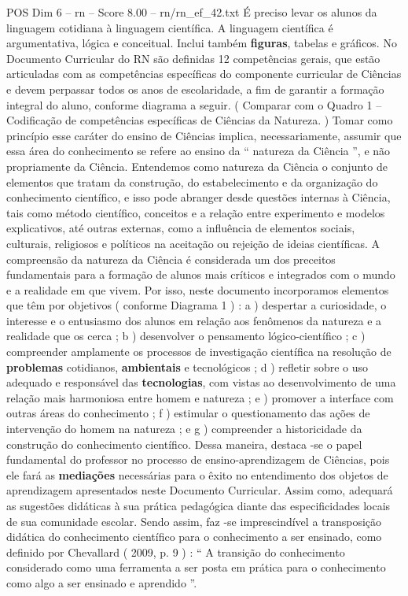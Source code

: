 \begin{textsample}{POS Dim 6 – rn – Score 8.00 – rn/rn\_ef\_42.txt}
É preciso levar os alunos da linguagem cotidiana à linguagem científica.
A linguagem científica é argumentativa, lógica e conceitual.
Inclui também \textbf{figuras}, tabelas e gráficos.
No Documento Curricular do RN são definidas 12 competências gerais, que estão articuladas com as competências específicas do componente curricular de Ciências e devem perpassar todos os anos de escolaridade, a fim de garantir a formação integral do aluno, conforme diagrama a seguir. ( Comparar com o Quadro 1 – Codificação de competências específicas de Ciências da Natureza. ) Tomar como princípio esse caráter do ensino de Ciências implica, necessariamente, assumir que essa área do conhecimento se refere ao ensino da “ natureza da Ciência ”, e não propriamente da Ciência.
Entendemos como natureza da Ciência o conjunto de elementos que tratam da construção, do estabelecimento e da organização do conhecimento científico, e isso pode abranger desde questões internas à Ciência, tais como método científico, conceitos e a relação entre experimento e modelos explicativos, até outras externas, como a influência de elementos sociais, culturais, religiosos e políticos na aceitação ou rejeição de ideias científicas.
A compreensão da natureza da Ciência é considerada um dos preceitos fundamentais para a formação de alunos mais críticos e integrados com o mundo e a realidade em que vivem.
Por isso, neste documento incorporamos elementos que têm por objetivos ( conforme Diagrama 1 ) : a ) despertar a curiosidade, o interesse e o entusiasmo dos alunos em relação aos fenômenos da natureza e a realidade que os cerca ; b ) desenvolver o pensamento lógico-científico ; c ) compreender amplamente os processos de investigação científica na resolução de \textbf{problemas} cotidianos, \textbf{ambientais} e tecnológicos ; d ) refletir sobre o uso adequado e responsável das \textbf{tecnologias}, com vistas ao desenvolvimento de uma relação mais harmoniosa entre homem e natureza ; e ) promover a interface com outras áreas do conhecimento ; f ) estimular o questionamento das ações de intervenção do homem na natureza ; e g ) compreender a historicidade da construção do conhecimento científico.
Dessa maneira, destaca -se o papel fundamental do professor no processo de ensino-aprendizagem de Ciências, pois ele fará as \textbf{mediações} necessárias para o êxito no entendimento dos objetos de aprendizagem apresentados neste Documento Curricular.
Assim como, adequará as sugestões didáticas à sua prática pedagógica diante das especificidades locais de sua comunidade escolar.
Sendo assim, faz -se imprescindível a transposição didática do conhecimento científico para o conhecimento a ser ensinado, como definido por Chevallard ( 2009, p. 9 ) : “ A transição do conhecimento considerado como uma ferramenta a ser posta em prática para o conhecimento como algo a ser ensinado e aprendido ”.

\end{textsample}

